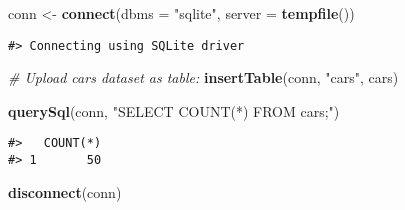 \documentclass[]{article}
\newenvironment{Shaded}{\begin{snugshade}}{\end{snugshade}}
\newcommand{\CommentTok}[1]{\textcolor[rgb]{0.56,0.35,0.01}{\textit{#1}}}
\newcommand{\DataTypeTok}[1]{\textcolor[rgb]{0.13,0.29,0.53}{#1}}
\newcommand{\KeywordTok}[1]{\textcolor[rgb]{0.13,0.29,0.53}{\textbf{#1}}}
\newcommand{\NormalTok}[1]{#1}
\newcommand{\StringTok}[1]{\textcolor[rgb]{0.31,0.60,0.02}{#1}}
\begin{document}
\begin{Shaded}
\begin{Highlighting}[]
\NormalTok{conn <-}\StringTok{ }\KeywordTok{connect}\NormalTok{(}\DataTypeTok{dbms =} \StringTok{"sqlite"}\NormalTok{, }\DataTypeTok{server =} \KeywordTok{tempfile}\NormalTok{())}
\end{Highlighting}
\end{Shaded}

\begin{verbatim}
#> Connecting using SQLite driver
\end{verbatim}

\begin{Shaded}
\begin{Highlighting}[]
\CommentTok{# Upload cars dataset as table:}
\KeywordTok{insertTable}\NormalTok{(conn, }\StringTok{"cars"}\NormalTok{, cars)}

\KeywordTok{querySql}\NormalTok{(conn, }\StringTok{"SELECT COUNT(*) FROM cars;"}\NormalTok{)}
\end{Highlighting}
\end{Shaded}

\begin{verbatim}
#>   COUNT(*)
#> 1       50
\end{verbatim}

\begin{Shaded}
\begin{Highlighting}[]
\KeywordTok{disconnect}\NormalTok{(conn)}
\end{Highlighting}
\end{Shaded}
\end{document}
